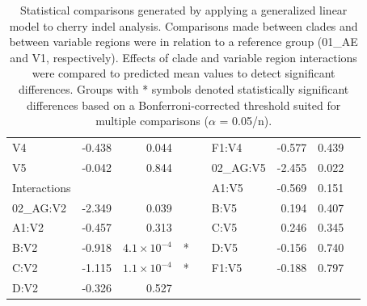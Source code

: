 \documentclass[12pt]{article}
\begin{document}
\begin{table}[htbp]
\begin{tabular}{lrrcclrrc}
  \hspace{1em}V4 & -0.438 & 0.044 & & &\hspace{1em}F1:V4 & -0.577 & 0.439 &  \\ 
  \hspace{1em}V5 & -0.042 & 0.844 & & &\hspace{1em}02\_AG:V5 & -2.455 & 0.022 & \\ 
  Interactions & & & &&\hspace{1em}A1:V5 & -0.569 & 0.151 & \\ 
  \hspace{1em}02\_AG:V2 & -2.349 & 0.039 & & &\hspace{1em}B:V5 & 0.194 & 0.407 & \\ 
  \hspace{1em}A1:V2 & -0.457 & 0.313 &  &&\hspace{1em}C:V5 & 0.246 & 0.345 & \\ 
  \hspace{1em}B:V2 & -0.918 & $4.1\times 10^{-4}$& * & &\hspace{1em}D:V5 & -0.156 & 0.740 & \\ 
  \hspace{1em}C:V2 & -1.115 & $1.1\times 10^{-4}$ & * & &\hspace{1em}F1:V5 & -0.188 & 0.797 & \\ 
  \hspace{1em}D:V2 & -0.326 & 0.527 &  & &\\  
  
  \hline
  \end{tabular}
  
  \caption{
    Statistical comparisons generated by applying a generalized linear model to cherry indel analysis. 
    Comparisons made between clades and between variable regions were in relation to a reference group (01\_AE and V1, respectively). 
    Effects of clade and variable region interactions were compared to predicted mean values to detect significant differences. 
    Groups with * symbols denoted statistically significant differences based on a Bonferroni-corrected threshold suited for multiple comparisons ($\alpha$ = 0.05/n). 
    }
    \label{tab:glm}
\end{table}
\end{document}
